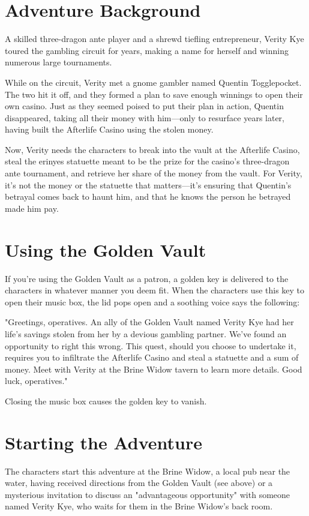 \documentclass[10pt,a4paper,twoside,bg=print,twocolumn,openany,nodeprecatedcode]{dndbook}
\begin{document}
\section{Adventure Background}
A skilled three-dragon ante player and a shrewd tiefling entrepreneur, Verity Kye toured the gambling circuit for years, making a name for herself and winning numerous large tournaments.

While on the circuit, Verity met a gnome gambler named Quentin Togglepocket. The two hit it off, and they formed a plan to save enough winnings to open their own casino. Just as they seemed poised to put their plan in action, Quentin disappeared, taking all their money with him—only to resurface years later, having built the Afterlife Casino using the stolen money.

Now, Verity needs the characters to break into the vault at the Afterlife Casino, steal the erinyes statuette meant to be the prize for the casino's three-dragon ante tournament, and retrieve her share of the money from the vault. For Verity, it's not the money or the statuette that matters—it's ensuring that Quentin's betrayal comes back to haunt him, and that he knows the person he betrayed made him pay.

\section{Using the Golden Vault}
If you're using the Golden Vault as a patron, a golden key is delivered to the characters in whatever manner you deem fit. When the characters use this key to open their music box, the lid pops open and a soothing voice says the following:

\begin{DndReadAloud}{}
"Greetings, operatives. An ally of the Golden Vault named Verity Kye had her life's savings stolen from her by a devious gambling partner. We've found an opportunity to right this wrong. This quest, should you choose to undertake it, requires you to infiltrate the Afterlife Casino and steal a statuette and a sum of money. Meet with Verity at the Brine Widow tavern to learn more details. Good luck, operatives."

\end{DndReadAloud}

Closing the music box causes the golden key to vanish.

\section{Starting the Adventure}
The characters start this adventure at the Brine Widow, a local pub near the water, having received directions from the Golden Vault (see above) or a mysterious invitation to discuss an "advantageous opportunity" with someone named Verity Kye, who waits for them in the Brine Widow's back room.
\end{document}
